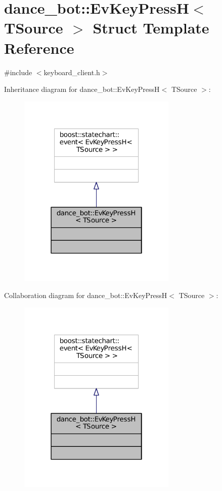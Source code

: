 \hypertarget{structdance__bot_1_1EvKeyPressH}{}\section{dance\+\_\+bot\+:\+:Ev\+Key\+PressH$<$ T\+Source $>$ Struct Template Reference}
\label{structdance__bot_1_1EvKeyPressH}


{\ttfamily \#include $<$keyboard\+\_\+client.\+h$>$}



Inheritance diagram for dance\+\_\+bot\+:\+:Ev\+Key\+PressH$<$ T\+Source $>$\+:
\nopagebreak
\begin{figure}[H]
\begin{center}
\leavevmode
\includegraphics[width=214pt]{structdance__bot_1_1EvKeyPressH__inherit__graph}
\end{center}
\end{figure}


Collaboration diagram for dance\+\_\+bot\+:\+:Ev\+Key\+PressH$<$ T\+Source $>$\+:
\nopagebreak
\begin{figure}[H]
\begin{center}
\leavevmode
\includegraphics[width=214pt]{structdance__bot_1_1EvKeyPressH__coll__graph}
\end{center}
\end{figure}


